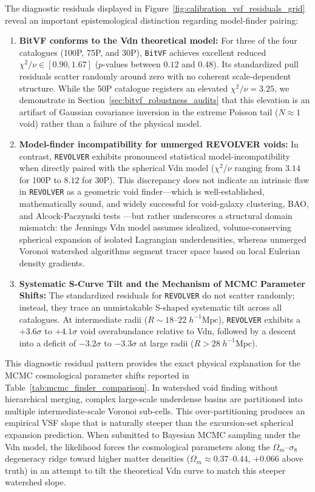 \documentclass[12pt]{report}
\begin{document}
The diagnostic residuals displayed in Figure~\ref{fig:calibration_vsf_residuals_grid} reveal an important epistemological distinction regarding model-finder pairing:
\begin{enumerate}
    \item \textbf{BitVF conforms to the Vdn theoretical model:} For three of the four catalogues (100P, 75P, and 30P), \texttt{BitVF} achieves excellent reduced $\chi^2/\nu \in [0.90, 1.67]$ ($p$-values between $0.12$ and $0.48$). Its standardized pull residuals scatter randomly around zero with no coherent scale-dependent structure. While the 50P catalogue registers an elevated $\chi^2/\nu = 3.25$, we demonstrate in Section~\ref{sec:bitvf_robustness_audits} that this elevation is an artifact of Gaussian covariance inversion in the extreme Poisson tail ($N \approx 1$ void) rather than a failure of the physical model.
    \item \textbf{Model-finder incompatibility for unmerged REVOLVER voids:} In contrast, \texttt{REVOLVER} exhibits pronounced statistical model-incompatibility when directly paired with the spherical Vdn model ($\chi^2/\nu$ ranging from $3.14$ for 100P to $8.12$ for 30P). This discrepancy does not indicate an intrinsic flaw in \texttt{REVOLVER} as a geometric void finder—which is well-established, mathematically sound, and widely successful for void-galaxy clustering, BAO, and Alcock-Paczynski tests \citep{Nadathur2019}—but rather underscores a structural domain mismatch: the Jennings Vdn model assumes idealized, volume-conserving spherical expansion of isolated Lagrangian underdensities, whereas unmerged Voronoi watershed algorithms segment tracer space based on local Eulerian density gradients.
    \item \textbf{Systematic S-Curve Tilt and the Mechanism of MCMC Parameter Shifts:} The standardized residuals for \texttt{REVOLVER} do not scatter randomly; instead, they trace an unmistakable S-shaped systematic tilt across all catalogues. At intermediate radii ($R \sim 18$--$22\;h^{-1}\mathrm{Mpc}$), \texttt{REVOLVER} exhibits a $+3.6\sigma$ to $+4.1\sigma$ void overabundance relative to Vdn, followed by a descent into a deficit of $-3.2\sigma$ to $-3.3\sigma$ at large radii ($R > 28\;h^{-1}\mathrm{Mpc}$).
\end{enumerate}

This diagnostic residual pattern provides the exact physical explanation for the MCMC cosmological parameter shifts reported in Table~\ref{tab:mcmc_finder_comparison}. In watershed void finding without hierarchical merging, complex large-scale underdense basins are partitioned into multiple intermediate-scale Voronoi sub-cells. This over-partitioning produces an empirical VSF slope that is naturally steeper than the excursion-set spherical expansion prediction. When submitted to Bayesian MCMC sampling under the Vdn model, the likelihood forces the cosmological parameters along the $\Omega_m$--$\sigma_8$ degeneracy ridge toward higher matter densities ($\Omega_m \approx 0.37$--$0.44$, $+0.066$ above truth) in an attempt to tilt the theoretical Vdn curve to match this steeper watershed slope. 
\end{document}

